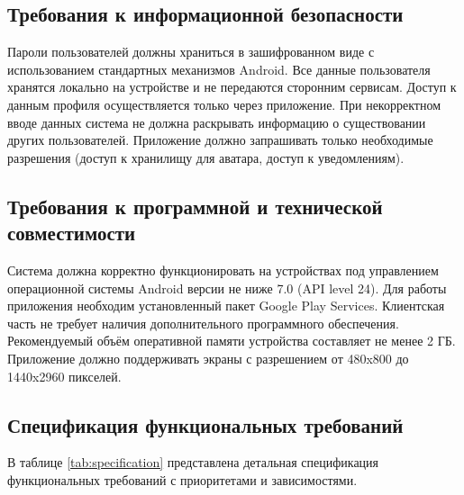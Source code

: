 \subsection{Требования к информационной безопасности}

Пароли пользователей должны храниться в зашифрованном виде с использованием стандартных механизмов Android. Все данные пользователя хранятся локально на устройстве и не передаются сторонним сервисам. Доступ к данным профиля осуществляется только через приложение. При некорректном вводе данных система не должна раскрывать информацию о существовании других пользователей. Приложение должно запрашивать только необходимые разрешения (доступ к хранилищу для аватара, доступ к уведомлениям).

\subsection{Требования к программной и технической совместимости}

Система должна корректно функционировать на устройствах под управлением операционной системы Android версии не ниже 7.0 (API level 24). Для работы приложения необходим установленный пакет Google Play Services. Клиентская часть не требует наличия дополнительного программного обеспечения. Рекомендуемый объём оперативной памяти устройства составляет не менее 2 ГБ. Приложение должно поддерживать экраны с разрешением от 480x800 до 1440x2960 пикселей.

\subsection{Спецификация функциональных требований}

В таблице \ref{tab:specification} представлена детальная спецификация функциональных требований с приоритетами и зависимостями.

